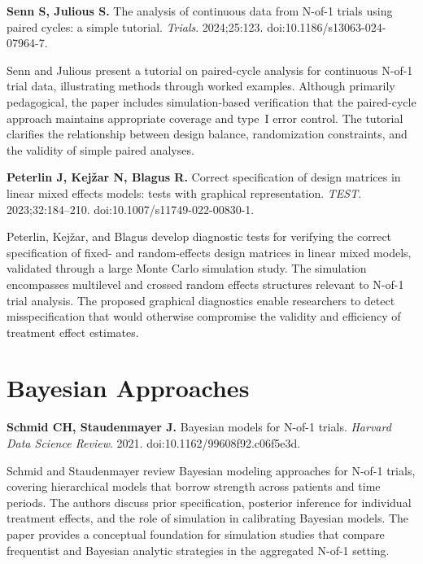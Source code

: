 \documentclass[11pt]{article}
\begin{document}
\medskip
\textbf{Senn S, Julious S.} The analysis of continuous data
from N-of-1 trials using paired cycles: a simple tutorial.
\textit{Trials}. 2024;25:123.
doi:10.1186/s13063-024-07964-7.

\smallskip\noindent
Senn and Julious present a tutorial on paired-cycle
analysis for continuous N-of-1 trial data, illustrating
methods through worked examples. Although primarily
pedagogical, the paper includes simulation-based
verification that the paired-cycle approach maintains
appropriate coverage and type~I error control. The tutorial
clarifies the relationship between design balance,
randomization constraints, and the validity of simple
paired analyses.

\medskip
\textbf{Peterlin J, Kej\v{z}ar N, Blagus R.} Correct
specification of design matrices in linear mixed effects
models: tests with graphical representation. \textit{TEST}.
2023;32:184--210. doi:10.1007/s11749-022-00830-1.

\smallskip\noindent
Peterlin, Kej\v{z}ar, and Blagus develop diagnostic tests
for verifying the correct specification of fixed- and
random-effects design matrices in linear mixed models,
validated through a large Monte Carlo simulation study.
The simulation encompasses multilevel and crossed random
effects structures relevant to N-of-1 trial analysis. The
proposed graphical diagnostics enable researchers to detect
misspecification that would otherwise compromise the
validity and efficiency of treatment effect estimates.

\section{Bayesian Approaches}

\textbf{Schmid CH, Staudenmayer J.} Bayesian models for
N-of-1 trials. \textit{Harvard Data Science Review}. 2021.
doi:10.1162/99608f92.c06f5e3d.

\smallskip\noindent
Schmid and Staudenmayer review Bayesian modeling approaches
for N-of-1 trials, covering hierarchical models that borrow
strength across patients and time periods. The authors
discuss prior specification, posterior inference for
individual treatment effects, and the role of simulation in
calibrating Bayesian models. The paper provides a
conceptual foundation for simulation studies that compare
frequentist and Bayesian analytic strategies in the
aggregated N-of-1 setting.
\end{document}
